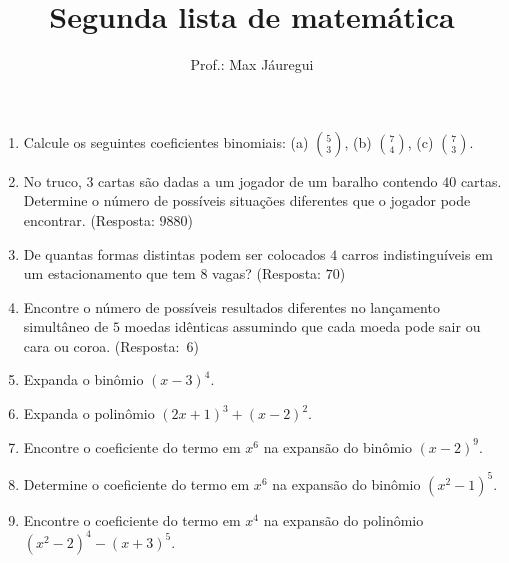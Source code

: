 \documentclass[12pt,a4paper]{article}
\title{Segunda lista de matemática}
\author{Prof.: Max Jáuregui}
\date{}
\begin{document}
\maketitle
\begin{enumerate}
  \item Calcule os seguintes coeficientes binomiais: (a) $\binom{5}{3}$, (b) $\binom{7}{4}$, (c) $\binom{7}{3}$.
  \item No truco, $3$ cartas são dadas a um jogador de um baralho contendo $40$ cartas. Determine o número de possíveis situações diferentes que o jogador pode encontrar. (Resposta: $9880$)
  \item De quantas formas distintas podem ser colocados $4$ carros indistinguíveis em um estacionamento que tem $8$ vagas? (Resposta: $70$)
  \item Encontre o número de possíveis resultados diferentes no lançamento simultâneo de $5$ moedas idênticas assumindo que cada moeda pode sair ou cara ou coroa. (Resposta:~$6$)
  \item Expanda o binômio $(x-3)^4$.
  \item Expanda o polinômio $(2x+1)^3+(x-2)^2$.
  \item Encontre o coeficiente do termo em $x^6$ na expansão do binômio $(x-2)^9$.
  \item Determine o coeficiente do termo em $x^6$ na expansão do binômio $(x^2-1)^5$.
  \item Encontre o coeficiente do termo em $x^4$ na expansão do polinômio $(x^2-2)^4-(x+3)^5$.
\end{enumerate}
\end{document}
